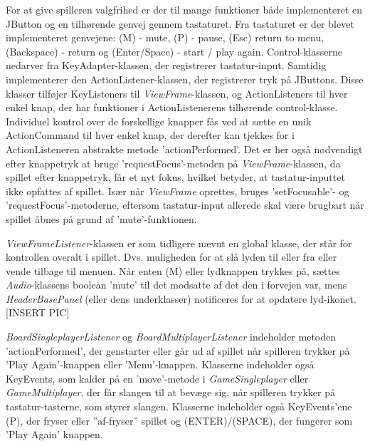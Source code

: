 For at give spilleren valgfrihed er der til mange funktioner både implementeret en JButton og en tilhørende genvej gennem tastaturet. Fra tastaturet er der blevet implementeret genvejene: (M) - mute, (P) - pause, (Esc) return to menu, (Backspace) - return og (Enter/Space) - start / play again. Control-klasserne nedarver fra KeyAdapter-klassen, der registrerer tastatur-input. Samtidig implementerer den ActionListener-klassen, der registrerer tryk på JButtons. Disse klasser tilføjer KeyListeners til \textit{ViewFrame}-klassen, og ActionListeners til hver enkel knap, der har funktioner i ActionListenerens tilhørende control-klasse. Individuel kontrol over de forskellige knapper fås ved at sætte en unik ActionCommand til hver enkel knap, der derefter kan tjekkes for i ActionListeneren abstrakte metode 'actionPerformed'. Det er her også nødvendigt efter knappetryk at bruge 'requestFocus'-metoden på \textit{ViewFrame}-klassen, da spillet efter knappetryk, får et nyt fokus, hvilket betyder, at tastatur-inputtet ikke opfattes af spillet.
Især når \textit{ViewFrame} oprettes, bruges 'setFocusable'- og 'requestFocus'-metoderne, eftersom tastatur-input allerede skal være brugbart når spillet åbnes på grund af 'mute'-funktionen.
\linebreak

\textit{ViewFrameListener}-klassen er som tidligere nævnt en global klasse, der står for kontrollen overalt i spillet. Dvs. muligheden for at slå lyden til eller fra eller vende tilbage til menuen. Når enten (M) eller lydknappen trykkes på, sættes \textit{Audio}-klassens boolean 'mute' til det modsatte af det den i forvejen var, mens \textit{HeaderBasePanel} (eller dens underklasser) notificeres for at opdatere lyd-ikonet. [INSERT PIC]


\textit{BoardSingleplayerListener} og \textit{BoardMultiplayerListener} indeholder metoden 'actionPerformed', der genstarter eller går ud af spillet når spilleren trykker på 'Play Again'-knappen eller 'Menu'-knappen. Klasserne indeholder også KeyEvents, som kalder på en 'move'-metode i \textit{GameSingleplayer} eller \textit{GameMultiplayer}, der får slangen til at bevæge sig, når spilleren trykker på tastatur-tasterne, som styrer slangen. Klasserne indeholder også KeyEvents'ene (P), der fryser eller ''af-fryser'' spillet og (ENTER)/(SPACE), der fungerer som 'Play Again' knappen.
\linebreak

